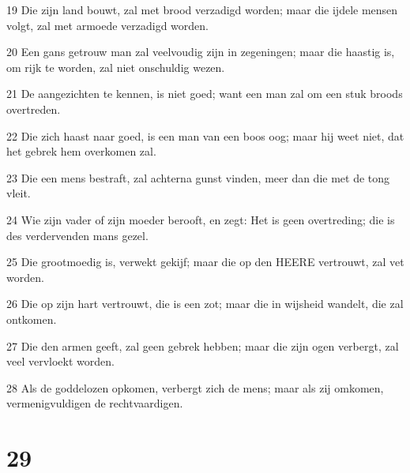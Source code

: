 \par 19 Die zijn land bouwt, zal met brood verzadigd worden; maar die ijdele mensen volgt, zal met armoede verzadigd worden.
\par 20 Een gans getrouw man zal veelvoudig zijn in zegeningen; maar die haastig is, om rijk te worden, zal niet onschuldig wezen.
\par 21 De aangezichten te kennen, is niet goed; want een man zal om een stuk broods overtreden.
\par 22 Die zich haast naar goed, is een man van een boos oog; maar hij weet niet, dat het gebrek hem overkomen zal.
\par 23 Die een mens bestraft, zal achterna gunst vinden, meer dan die met de tong vleit.
\par 24 Wie zijn vader of zijn moeder berooft, en zegt: Het is geen overtreding; die is des verdervenden mans gezel.
\par 25 Die grootmoedig is, verwekt gekijf; maar die op den HEERE vertrouwt, zal vet worden.
\par 26 Die op zijn hart vertrouwt, die is een zot; maar die in wijsheid wandelt, die zal ontkomen.
\par 27 Die den armen geeft, zal geen gebrek hebben; maar die zijn ogen verbergt, zal veel vervloekt worden.
\par 28 Als de goddelozen opkomen, verbergt zich de mens; maar als zij omkomen, vermenigvuldigen de rechtvaardigen.

\chapter{29}

